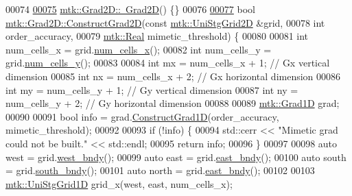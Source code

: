 \begin{DoxyCode}
00074 
\hypertarget{mtk__grad__2d_8cc_source_l00075}{}\hyperlink{classmtk_1_1Grad2D_ae6a071b24422d057c41346e80be96cb3}{00075} \hyperlink{classmtk_1_1Grad2D_ae6a071b24422d057c41346e80be96cb3}{mtk::Grad2D::~Grad2D}() \{\}
00076 
\hypertarget{mtk__grad__2d_8cc_source_l00077}{}\hyperlink{classmtk_1_1Grad2D_a9771be954c59880e3d83f4d645378c00}{00077} \textcolor{keywordtype}{bool} \hyperlink{classmtk_1_1Grad2D_a9771be954c59880e3d83f4d645378c00}{mtk::Grad2D::ConstructGrad2D}(\textcolor{keyword}{const} 
      \hyperlink{classmtk_1_1UniStgGrid2D}{mtk::UniStgGrid2D} &grid,
00078                                   \textcolor{keywordtype}{int} order\_accuracy,
00079                                   \hyperlink{group__c01-roots_gac080bbbf5cbb5502c9f00405f894857d}{mtk::Real} mimetic\_threshold) \{
00080 
00081   \textcolor{keywordtype}{int} num\_cells\_x = grid.\hyperlink{classmtk_1_1UniStgGrid2D_a2d182866a398aba8e4829590e85bf939}{num\_cells\_x}();
00082   \textcolor{keywordtype}{int} num\_cells\_y = grid.\hyperlink{classmtk_1_1UniStgGrid2D_aed05a801cc9a76dba0ff203cea58a61a}{num\_cells\_y}();
00083 
00084   \textcolor{keywordtype}{int} mx = num\_cells\_x + 1;  \textcolor{comment}{// Gx vertical dimension}
00085   \textcolor{keywordtype}{int} nx = num\_cells\_x + 2;  \textcolor{comment}{// Gx horizontal dimension}
00086   \textcolor{keywordtype}{int} my = num\_cells\_y + 1;  \textcolor{comment}{// Gy vertical dimension}
00087   \textcolor{keywordtype}{int} ny = num\_cells\_y + 2;  \textcolor{comment}{// Gy horizontal dimension}
00088 
00089   \hyperlink{classmtk_1_1Grad1D}{mtk::Grad1D} grad;
00090 
00091   \textcolor{keywordtype}{bool} info = grad.\hyperlink{classmtk_1_1Grad1D_a74ef5245cfae6fd158bd7f563a0c2e52}{ConstructGrad1D}(order\_accuracy, mimetic\_threshold);
00092 
00093   \textcolor{keywordflow}{if} (!info) \{
00094     std::cerr << \textcolor{stringliteral}{"Mimetic grad could not be built."} << std::endl;
00095     \textcolor{keywordflow}{return} info;
00096   \}
00097 
00098   \textcolor{keyword}{auto} west = grid.\hyperlink{classmtk_1_1UniStgGrid2D_af2b1712387ded85edaf2b64617d3fc13}{west\_bndy}();
00099   \textcolor{keyword}{auto} east = grid.\hyperlink{classmtk_1_1UniStgGrid2D_a03f689eb29a6369b82ce1207c655d5ff}{east\_bndy}();
00100   \textcolor{keyword}{auto} south = grid.\hyperlink{classmtk_1_1UniStgGrid2D_a1442eaf219f099d0ebf46a170fdebf92}{south\_bndy}();
00101   \textcolor{keyword}{auto} north = grid.\hyperlink{classmtk_1_1UniStgGrid2D_a03f689eb29a6369b82ce1207c655d5ff}{east\_bndy}();
00102 
00103   \hyperlink{classmtk_1_1UniStgGrid1D}{mtk::UniStgGrid1D} grid\_x(west, east, num\_cells\_x);

\end{DoxyCode}
